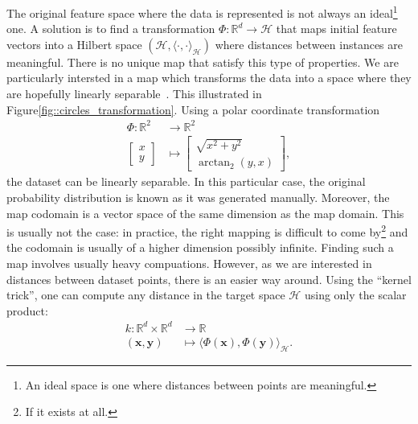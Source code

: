                 The original feature space where the data is represented is not always an ideal\footnote{An ideal space is one where distances between points are meaningful.} one.
                A solution is to find a transformation $\Phi: \mathbb{R}^d \rightarrow \mathscr{H}$ that maps initial feature vectors into a Hilbert space $(\mathscr{H}, \langle\cdot{,}\cdot\rangle_{\mathscr{H}})$ where distances between instances are meaningful.
                There is no unique map that satisfy this type of properties.
                We are particularly intersted in a map which transforms the data into a space where they are hopefully linearly separable~\parencite{boser1992training}.
                This illustrated in Figure\ref{fig::circles_transformation}.
                Using a polar coordinate transformation 
                \begin{align*}
                    \Phi: \mathbb{R}^2 &\rightarrow \mathbb{R}^2 \\
                    \begin{bmatrix}
                        x \\
                        y
                    \end{bmatrix} &\mapsto \begin{bmatrix}
                        \sqrt{x^2 + y^2} \\
                        \operatorname{arctan}_2(y, x)
                    \end{bmatrix},
                \end{align*}
                the dataset can be linearly separable.
                In this particular case, the original probability distribution is known as it was generated manually.
                Moreover, the map codomain is a vector space of the same dimension as the map domain.
                This is usually not the case: in practice, the right mapping is difficult to come by\footnote{If it exists at all.} and the codomain is usually of a higher dimension possibly infinite.
                Finding such a map involves usually heavy compuations.
                However, as we are interested in distances between dataset points, there is an easier way around.
                Using the ``kernel trick'', one can compute any distance in the target space $\mathscr{H}$ using only the scalar product:
                \begin{align}
                    \label{eq::kernel_definition}
                    k: \mathbb{R}^d \times \mathbb{R}^d &\rightarrow \mathbb{R}\\
                    (\bm{x}, \bm{y}) &\mapsto \langle\Phi(\bm{x}), \Phi(\bm{y})\rangle_{\mathscr{H}} \nonumber.
                \end{align}
